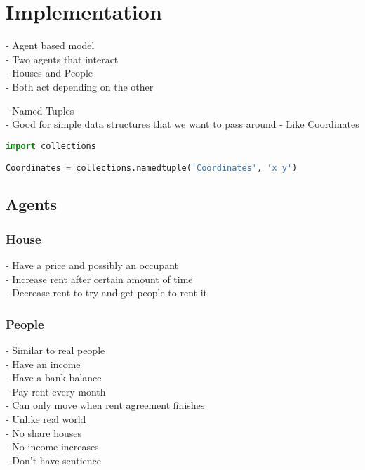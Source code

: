 \section{Implementation}

\par
- Agent based model \\
- Two agents that interact \\
- Houses and People \\
- Both act depending on the other \\

\par
- Named Tuples \\
- Good for simple data structures that we want to pass around
- Like Coordinates

\begin{lstlisting}[language=Python]
import collections

Coordinates = collections.namedtuple('Coordinates', 'x y')
\end{lstlisting}

\subsection{Agents}

\subsubsection{House}
\par
- Have a price and possibly an occupant \\
- Increase rent after certain amount of time \\
- Decrease rent to try and get people to rent it \\

\subsubsection{People}
\par
- Similar to real people \\
  - Have an income \\
  - Have a bank balance \\
  - Pay rent every month \\
  - Can only move when rent agreement finishes \\
- Unlike real world \\
  - No share houses \\
  - No income increases \\
  - Don't have sentience \\

